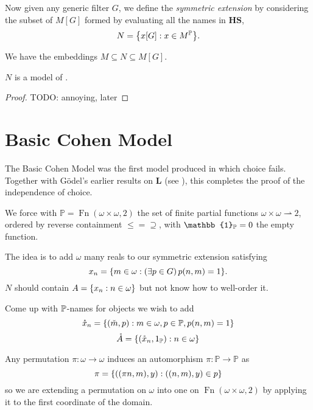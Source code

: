 \begin{definition}
    Now given any generic filter \(G\), we define the \emph{symmetric extension}
    by considering the subset of \(M[G]\) formed by evaluating all the names in \(\mathbf{HS}\),
    \[ N = \set{ x[G]: x\in M^{\mathbb{P}} }. \]
\end{definition}
\begin{observation}
    We have the embeddings \(M \subseteq N \subseteq M[G]\).
\end{observation}

\begin{theorem}
    \(N\) is a model of \ZF.
\end{theorem}
\begin{proof}
    TODO: annoying, later
\end{proof}

\section{Basic Cohen Model}

The Basic Cohen Model was the first model produced in which choice fails.
Together with Gödel's earlier results on \(\mathbf{L}\) (see ),
this completes the proof of the independence of choice.

We force with \(\mathbb{P} = \operatorname{Fn}(\omega\times\omega, 2)\)
the set of finite partial functions \(\omega\times\omega \rightharpoonup 2\),
ordered by reverse containment \(\leq = \supseteq\),
with \(\mathbb{1}_\P = 0\) the empty function.

The idea is to add \(\omega\) many reals to our symmetric extension satisfying
\begin{equation} \label{basicCohen:property_x_n}
    x_n = \set{m\in\omega: \left(\exists p\in G\right) p(n,m) = 1}.
\end{equation}
\(N\) should contain \( A = \set{x_n:n\in \omega } \) but not know how to well-order it.

Come up with \(\P\)-names for objects we wish to add
\[ \mathring{x}_n = \set{(\check{m},p): m\in\omega, p\in\P,p(n,m) = 1} \]
\[ \mathring{A} = \set{(\mathring{x}_n,1_\P): n\in\omega} \]


Any permutation \(\pi: \omega \to \omega\) induces an automorphism \(\pi: \mathbb{P}\to\mathbb{P}\) as
\[ \pi = \set{((\pi n, m), y): ((n,m),y) \in p} \]
so we are extending a permutation on \(\omega\) into one on \(\operatorname{Fn}(\omega\times\omega, 2)\)
by applying it to the first coordinate of the domain.

